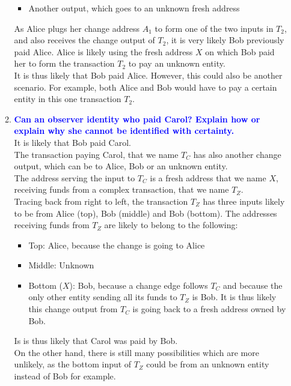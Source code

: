 \documentclass[11pt]{article}
\begin{document}
\begin{enumerate}
\begin{enumerate}
\begin{itemize}
            \item Another output, which goes to an unknown fresh address
        \end{itemize}
        As Alice plugs her change address $A_1$ to form one of the two inputs in $T_2$, and also receives the change output of $T_2$, it is very likely Bob previously paid Alice. Alice is likely using the fresh address $X$ on which Bob paid her to form the transaction $T_2$ to pay an unknown entity.
        \\ It is thus likely that Bob paid Alice. However, this could also be another scenario. For example, both Alice and Bob would have to pay a certain entity in this one transaction $T_2$.
    \item \textbf{\textcolor{blue}{Can an observer identity who paid Carol? Explain how or explain why she cannot be identified with certainty.}}
        \\ It is likely that Bob paid Carol.
        \\ The transaction paying Carol, that we name $T_C$ has also another change output, which can be to Alice, Bob or an unknown entity.
        \\ The address serving the input to $T_C$ is a fresh address that we name $X$, receiving funds from a complex transaction, that we name $T_Z$.
        \\ Tracing back from right to left, the transaction $T_Z$ has three inputs likely to be from Alice (top), Bob (middle) and Bob (bottom). The addresses receiving funds from $T_Z$ are likely to belong to the following:
        \begin{itemize}
            \item Top: Alice, because the change is going to Alice
            \item Middle: Unknown
            \item Bottom ($X$): Bob, because a change edge follows $T_C$ and because the only other entity sending all its funds to $T_Z$ is Bob. It is thus likely this change output from $T_C$ is going back to a fresh address owned by Bob.
        \end{itemize}
        Is is thus likely that Carol was paid by Bob.
        \\ On the other hand, there is still many possibilities which are more unlikely, as the bottom input of $T_Z$ could be from an unknown entity instead of Bob for example.
    \end{enumerate}
    

\end{enumerate}
\end{document}
